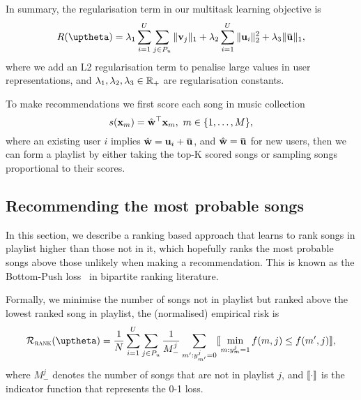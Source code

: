 In summary, the regularisation term in our multitask learning objective is
\begin{equation}
\label{eq:reg}
R(\uptheta) = \lambda_1 \sum_{i=1}^U \sum_{j \in P_u} \|\bv_j\|_1 + \lambda_2 \sum_{i=1}^U \|\bu_i\|_2^2 + \lambda_3 \|\widebar\bu\|_1,
\end{equation}
where we add an L2 regularisation term to penalise large values in user representations,
and $\lambda_1, \lambda_2, \lambda_3 \in \mathbb{R}_+$ are regularisation constants.

To make recommendations we first score each song in music collection
$$
s(\mathbf{x}_m) = \hat {\mathbf{w}}^\top \mathbf{x}_m, \ m \in \{1,\dots,M\},
$$
where an existing user $i$ implies $\hat\w = \bu_i + \widebar\bu$, and $\hat\w = \widebar\bu$ for new users,
then we can form a playlist by either taking the top-K scored songs or sampling songs proportional to their scores.

\subsection{Recommending the most probable songs}
\label{ssec:bploss}

In this section, we describe a ranking based approach that learns to rank songs in playlist higher
than those not in it, which hopefully ranks the most probable songs above those unlikely when making a recommendation.
This is known as the Bottom-Push loss~\cite{rudin2009p} in bipartite ranking literature.


Formally, we minimise the number of songs not in playlist but ranked above the lowest ranked song in playlist,
\ie the (normalised) empirical risk is
\begin{equation}
\label{eq:bprisk}
\RCal_\textsc{rank}(\uptheta) = \frac{1}{N} \sum_{i=1}^U \sum_{j \in P_u} \frac{1}{M_-^j} \sum_{m': y_{m'}^j = 0} 
\llb \min_{m: y_m^j = 1} f(m, j) \le f(m', j) \rrb,
\end{equation}
where $M_-^j$ denotes the number of songs that are not in playlist $j$,
and $\llbracket \cdot \rrbracket$ is the indicator function that represents the 0-1 loss.

